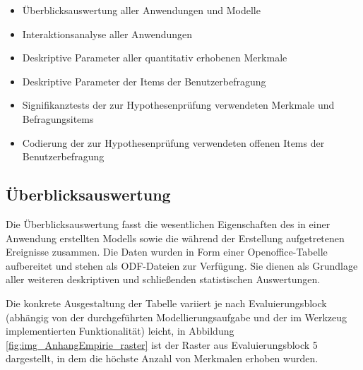\begin{itemize}
		\begin{itemize}
			\item Überblicksauswertung aller Anwendungen und Modelle
			\item Interaktionsanalyse aller Anwendungen
			\item Deskriptive Parameter aller quantitativ erhobenen Merkmale
			\item Deskriptive Parameter der Items der Benutzerbefragung
			\item Signifikanztests der zur Hypothesenprüfung verwendeten Merkmale und Befragungsitems
			\item Codierung der zur Hypothesenprüfung verwendeten offenen Items der Benutzerbefragung
		\end{itemize}
\end{itemize}

\subsection{Überblicksauswertung}

Die Überblicksauswertung fasst die wesentlichen Eigenschaften des in einer Anwendung erstellten Modells sowie die während der Erstellung aufgetretenen Ereignisse zusammen. Die Daten wurden in Form einer Openoffice-Tabelle aufbereitet und stehen als \gls{ODF}-Dateien zur Verfügung. Sie dienen als Grundlage aller weiteren deskriptiven und schließenden statistischen Auswertungen.

Die konkrete Ausgestaltung der Tabelle variiert je nach Evaluierungsblock (abhängig von der durchgeführten Modellierungsaufgabe und der im Werkzeug implementierten Funktionalität) leicht, in Abbildung \ref{fig:img_AnhangEmpirie_raster} ist der Raster aus Evaluierungsblock 5 dargestellt, in dem die höchste Anzahl von Merkmalen erhoben wurden.

